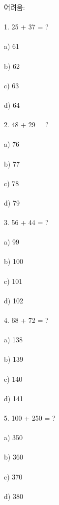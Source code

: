 \documentclass[fleqn]{article}
\begin{document}
어려움: \\\\
1. 25 + 37 = ? \\\\
   a) 61 \\\\
   b) 62 \\\\
   c) 63 \\\\
   d) 64 \\\\
  
2. 48 + 29 = ? \\\\
   a) 76 \\\\
   b) 77 \\\\
   c) 78 \\\\
   d) 79 \\\\
  
3. 56 + 44 = ? \\\\
   a) 99 \\\\
   b) 100 \\\\
   c) 101 \\\\
   d) 102 \\\\
  
4. 68 + 72 = ? \\\\
   a) 138 \\\\
   b) 139 \\\\
   c) 140 \\\\
   d) 141 \\\\
  
5. 100 + 250 = ? \\\\
   a) 350 \\\\
   b) 360 \\\\
   c) 370 \\\\
   d) 380 \\\\
  
      
        
\end{document}
